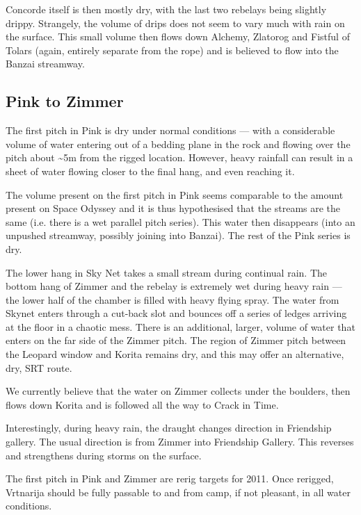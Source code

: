 Concorde itself is then mostly dry, with the last two rebelays being
slightly drippy. Strangely, the volume of drips does not seem to vary
much with rain on the surface. This small volume then flows 
down Alchemy, Zlatorog and Fistful of Tolars (again, entirely separate
from the rope) and is believed to flow into the Banzai streamway.

\subsection{Pink to Zimmer}

The first pitch in Pink is dry under normal conditions --- with a considerable
volume of water entering out of a bedding plane in the rock and flowing over
the pitch about \textasciitilde{}5m from the rigged location. However, heavy
rainfall can result in a sheet of water flowing closer to the final hang, and
even reaching it. 

The volume present on the first pitch in Pink seems comparable to the amount
present on Space Odyssey and it is thus hypothesised that the streams are the
same (i.e. there is a wet parallel pitch series). This water then disappears
(into an unpushed streamway, possibly joining into Banzai). The rest of the
Pink series is dry.

The lower hang in Sky Net takes a small stream during continual rain. The
bottom hang of Zimmer and the rebelay is extremely wet during heavy rain
--- the lower half of the chamber is filled with heavy
flying spray. The water from Skynet enters through a cut-back slot and bounces
off a series of ledges arriving at the floor in a chaotic mess. 
There is an additional, larger, volume of water that enters on the far side of
the Zimmer pitch. The region of Zimmer pitch between the Leopard window and Korita
remains dry, and this may offer an alternative, dry, SRT route. 

We currently believe that the water on Zimmer collects under the boulders, then
flows down Korita and is followed all the way to Crack in Time.

Interestingly, during heavy rain, the draught changes direction in
Friendship gallery. The usual direction is from Zimmer into Friendship Gallery.
This reverses and strengthens during storms on the surface.

The first pitch in Pink and Zimmer are rerig targets for 2011. Once
rerigged, Vrtnarija should be fully passable to and from camp, if not pleasant,
in all water conditions.

